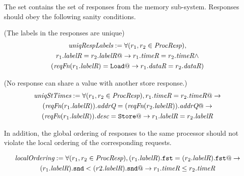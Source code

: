 The \Response{} set contains the set of responses from the memory sub-system.
Responses should obey the following sanity conditions. 
\begin{defn} (The labels in the responses are unique)
\small
\begin{multline*}
\textit{uniqRespLabels} := \forall (r_1, r_2 \in \textit{ProcResp}),\\
r_1.\textit{labelR} = r_2.\textit{labelR} @-> r_1.\textit{timeR} = r_2.\textit{timeR} \wedge\\
(\textit{reqFn}(r_1.\textit{labelR}) = \texttt{Load} @-> r_1.\textit{dataR} = r_2.\textit{dataR})
\end{multline*}
\label{uniqRespLabels}
\end{defn}

\begin{defn} (No response can share a \timeR{} value with another store response.)
\small
\begin{multline*}
\textit{uniqStTimes} := 
\forall (r_1, r_2 \in \textit{ProcResp}),
r_1.\textit{timeR} = r_2.\textit{timeR} @-> \\
(\textit{reqFn} (r_1.\textit{labelR})).\textit{addrQ} = (\textit{reqFn} (r_2.\textit{labelR})).\textit{addrQ} @->\\
(\textit{reqFn} (r_1.\textit{labelR})).\textit{desc} = \texttt{Store} @->
r_1.\textit{labelR} = r_2.\textit{labelR}
\end{multline*}
\label{uniqStTimes}
\end{defn}

In addition, the global ordering of responses to the same processor should not
violate the local ordering of the corresponding requests.

\begin{defn}
\small
\begin{multline*}
\textit{localOrdering} :=
\forall (r_1, r_2 \in \textit{ProcResp}), (r_1.\textit{labelR}).\texttt{fst} = (r_2.\textit{labelR}).\texttt{fst} @->\\
(r_1.\textit{labelR}).\texttt{snd} < (r2.\textit{labelR}).\texttt{snd} @-> r_1.\textit{timeR} \le r_2.\textit{timeR}
\end{multline*}
\label{localOrdering}
\end{defn}

